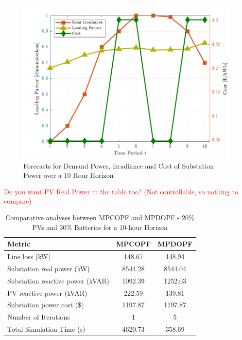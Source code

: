 \documentclass[../../outputs/main.tex]{subfiles}
\begin{document}
\begin{figure}[h!]
    \centering
    \includegraphics[height=0.25\textheight]{../figures/T10-inputCurves/InputCurves_Horizon_10.png}
    \caption{Forecasts for Demand Power, Irradiance and Cost of Substation Power over a 10 Hour Horizon}
    \label{fig:inputCurve-10}
\end{figure}

\textcolor{red}{Do you want PV Real Power in the table too? (Not controllable, so nothing to compare)}

\begin{table}[h!]
    \centering
    \caption{Comparative analyses between MPCOPF and MPDOPF - $20 \%$ PVs and $30 \%$ Batteries for a $10$-hour Horizon}
    \begin{tabular}{|l|c|c|}
    \hline
    \textbf{Metric} & \textbf{MPCOPF} & \textbf{MPDOPF} \\ \hline
    Line loss (kW) & 148.67 & 148.94 \\ \hline
    Substation real power (kW) & 8544.28 & 8544.04 \\ \hline
    Substation reactive power (kVAR) & 1092.39 & 1252.03 \\ \hline
    PV reactive power (kVAR) & 222.59 & 139.81 \\ \hline
    Substation power cost (\$) & 1197.87 & 1197.87 \\ \hline
    Number of Iterations & 1 & 5 \\ \hline
    Total Simulation Time (s) & 4620.73 & 358.69 \\ \hline
    \end{tabular}
    \label{table:opt-10-20-30}
\end{table}
\end{document}

